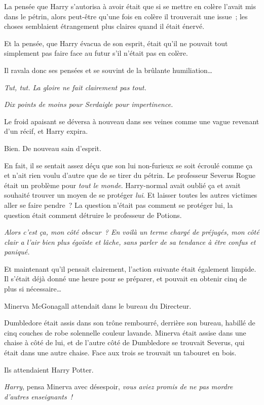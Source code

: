La pensée que Harry s'autorisa à avoir était que si se mettre en colère l'avait mis dans le pétrin, alors peut-être qu'une fois en colère il trouverait une issue~; les choses semblaient étrangement plus claires quand il était énervé.

Et la pensée, que Harry évacua de son esprit, était qu'il ne pouvait tout simplement pas faire face au futur s'il n'était pas en colère.

Il ravala donc ses pensées et se souvint de la brûlante humiliation…

\emph{Tut, tut. La gloire ne fait clairement pas tout.}

\emph{Dix points de moins pour Serdaigle pour impertinence.}

Le froid apaisant se déversa à nouveau dans ses veines comme une vague revenant d'un récif, et Harry expira.

Bien. De nouveau sain d'esprit.

En fait, il se sentait assez déçu que son lui non-furieux se soit écroulé comme ça et n'ait rien voulu d'autre que de se tirer du pétrin. Le professeur Severus Rogue était un problème pour \emph{tout le monde}. Harry-normal avait oublié ça et avait souhaité trouver un moyen de se protéger \emph{lui}. Et laisser toutes les autres victimes aller se faire pendre~? La question n'était pas comment se protéger lui, la question était comment détruire le professeur de Potions.

\emph{Alors c'est ça, mon côté obscur~? En voilà un terme chargé de préjugés, mon côté clair a l'air bien plus égoïste et lâche, sans parler de sa tendance à être confus et paniqué.}

Et maintenant qu'il pensait clairement, l'action suivante était également limpide. Il s'était déjà donné une heure pour se préparer, et pouvait en obtenir cinq de plus si nécessaire…

\later

Minerva McGonagall attendait dans le bureau du Directeur.

Dumbledore était assis dans son trône rembourré, derrière son bureau, habillé de cinq couches de robe solennelle couleur lavande. Minerva était assise dans une chaise à côté de lui, et de l'autre côté de Dumbledore se trouvait Severus, qui était dans une autre chaise. Face aux trois se trouvait un tabouret en bois.

Ils attendaient Harry Potter.

\emph{Harry}, pensa Minerva avec désespoir, \emph{vous aviez promis de ne pas mordre d'autres enseignants~!}

